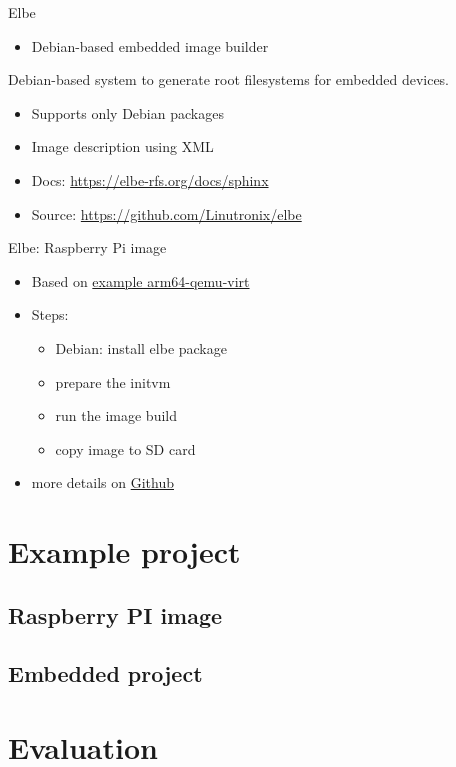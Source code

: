 \documentclass{beamer}
\begin{document}
\begin{frame}{Elbe}
	\begin{itemize}
		\item Debian-based embedded image builder
	\end{itemize}
	\begin{definition} 
		Debian-based system to generate root filesystems for embedded devices.
	\end{definition}
	\begin{itemize}
		\item Supports only Debian packages
		\item Image description using XML
		\item Docs: \url{https://elbe-rfs.org/docs/sphinx}
		\item Source: \url{https://github.com/Linutronix/elbe}
	\end{itemize}
\end{frame}

\begin{frame}{Elbe: Raspberry Pi image}
	\begin{itemize}
		\item Based on \href{https://github.com/Linutronix/elbe/blob/master/examples/arm64-qemu-virt.xml}{example arm64-qemu-virt}
		\item Steps:
		\begin{itemize}
			\item Debian: install elbe package
			\item prepare the initvm
			\item run the image build
			\item copy image to SD card
		\end{itemize}
		\item more details on \href{https://github.com/tomirgang/eh21_maintainable_linux/tree/main/examples/first_build_rpi4/elbe}{Github}
	\end{itemize}
\end{frame}

\section{Example project}

\subsection{Raspberry PI image}


\subsection{Embedded project}


\section{Evaluation}






\end{document}
